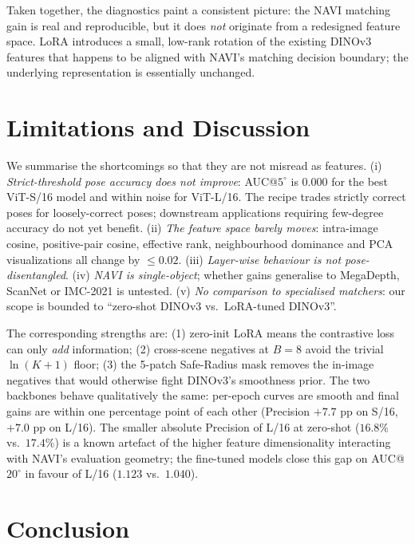 \documentclass[10pt,twocolumn,letterpaper]{article}
\begin{document}
Taken together, the diagnostics paint a consistent picture: the NAVI
matching gain is real and reproducible, but it does \emph{not}
originate from a redesigned feature space. LoRA introduces a small,
low-rank rotation of the existing DINOv3 features that happens to be
aligned with NAVI's matching decision boundary; the underlying
representation is essentially unchanged.

\section{Limitations and Discussion}
\label{sec:limits}

We summarise the shortcomings so that they are not misread as
features. (i) \emph{Strict-threshold pose accuracy does not improve}:
AUC@$5^\circ$ is $0.000$ for the best ViT-S/16 model and within noise
for ViT-L/16. The recipe trades strictly correct poses for
loosely-correct poses; downstream applications requiring few-degree
accuracy do not yet benefit. (ii) \emph{The feature space barely
moves}: intra-image cosine, positive-pair cosine, effective rank,
neighbourhood dominance and PCA visualizations all change by
$\le 0.02$. (iii) \emph{Layer-wise behaviour is not pose-disentangled}.
(iv) \emph{NAVI is single-object}; whether gains generalise to
MegaDepth, ScanNet or IMC-2021 is untested. (v) \emph{No comparison to
specialised matchers}: our scope is bounded to ``zero-shot DINOv3
vs.\ LoRA-tuned DINOv3''.

The corresponding strengths are: (1) zero-init LoRA means the
contrastive loss can only \emph{add} information; (2) cross-scene
negatives at $B=8$ avoid the trivial $\ln(K\!+\!1)$ floor; (3) the
5-patch Safe-Radius mask removes the in-image negatives that would
otherwise fight DINOv3's smoothness prior. The two backbones behave
qualitatively the same: per-epoch curves are smooth and final gains
are within one percentage point of each other (Precision $+7.7$ pp
on S/16, $+7.0$ pp on L/16). The smaller absolute Precision of L/16
at zero-shot ($16.8\%$ vs.\ $17.4\%$) is a known artefact of the
higher feature dimensionality interacting with NAVI's evaluation
geometry; the fine-tuned models close this gap on AUC@$20^\circ$ in
favour of L/16 ($1.123$ vs.\ $1.040$).

\section{Conclusion}
\end{document}
